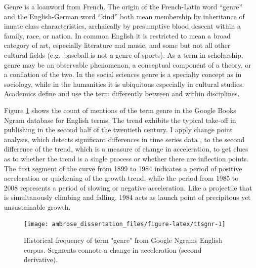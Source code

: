 \documentclass[]{book}
\theoremstyle{definition}
\theoremstyle{definition}
\theoremstyle{definition}
\theoremstyle{remark}
\begin{document}
Genre is a loanword from French. The origin of the French-Latin word
``genre'' and the English-German word ``kind'' both mean membership by
inheritance of innate class characteristics, archaically by presumptive
blood descent within a family, race, or nation. In common English it is
restricted to mean a broad category of art, especially literature and
music, and some but not all other cultural fields (e.g.~baseball is not
a genre of sports). As a term in scholarship, genre may be an observable
phenomenon, a conceptual component of a theory, or a conflation of the
two. In the social sciences genre is a specialty concept as in
sociology, while in the humanities it is ubiquitous especially in
cultural studies. Academics define and use the term differently between
and within disciplines.

Figure \ref{fig:ttsgnr} shows the count of mentions of the term genre in
the Google Books Ngram database for English terms. The trend exhibits
the typical take-off in publishing in the second half of the twentieth
century. I apply change point analysis, which detects significant
differences in time series data
\citep{Chen2012Parametric, Killick2016changepoint}, to the second
difference of the trend, which is a measure of change in acceleration,
to get clues as to whether the trend is a single process or whether
there are inflection points. The first segment of the curve from 1899 to
1984 indicates a period of positive acceleration or quickening of the
growth trend, while the period from 1985 to 2008 represents a period of
slowing or negative acceleration. Like a projectile that is
simultanously climbing and falling, 1984 acts as launch point of
precipitous yet unsustainable growth.

\begin{figure}

{\centering \texttt{[image: ambrose\_dissertation\_files/figure-latex/ttsgnr-1]} 

}

\caption{Historical frequency of term "genre" from Google Ngrams English corpus. Segments connote a change in acceleration (second derivative).}\label{fig:ttsgnr}
\end{figure}
\end{document}
